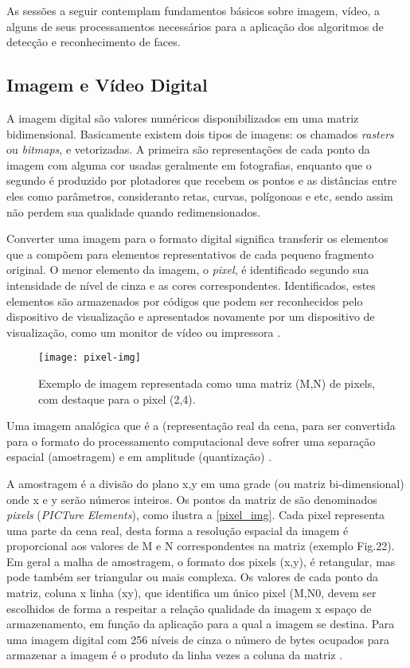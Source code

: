 As sessões a seguir contemplam fundamentos básicos sobre imagem, vídeo, a alguns de seus processamentos necessários para a aplicação dos algoritmos de detecção e reconhecimento de faces.


\subsection{Imagem e Vídeo Digital}\label{subsec:imagem}

A imagem digital são valores numéricos disponibilizados em uma matriz bidimensional. Basicamente existem dois tipos de imagens: os chamados \textit{rasters} ou \textit{bitmaps}, e vetorizadas. A primeira são representações de cada ponto da imagem com alguma cor usadas geralmente em fotografias, enquanto que o segundo é produzido por plotadores que recebem os pontos e as distâncias entre eles como parâmetros, consideranto retas, curvas, polígonoas e etc, sendo assim não perdem sua qualidade quando redimensionados.

Converter uma imagem para o formato digital significa transferir os elementos que a compõem para elementos representativos de cada pequeno fragmento original. O menor elemento da imagem, o \textit{pixel}, é identificado segundo sua intensidade de nível de cinza e as cores correspondentes. Identificados, estes elementos são armazenados por códigos que podem ser reconhecidos pelo dispositivo de visualização e apresentados novamente por um dispositivo de visualização, como um monitor de vídeo ou impressora \cite{img-digital-willians}. 

\begin{figure}[h]
	\centering
	\texttt{[image: pixel-img]}
	\caption{Exemplo de imagem representada como uma matriz (M,N) de pixels, com destaque para o pixel (2,4).}
	\label{pixel_img}
\end{figure}


Uma imagem analógica que é a (representação real da cena, para ser convertida para o formato do
processamento computacional deve sofrer uma separação espacial (amostragem) e em amplitude
(quantização) \cite{img-digital-willians}. 

A amostragem é a divisão do plano x,y em uma grade (ou matriz bi-dimensional) onde x e y serão números inteiros. Os pontos da matriz de são denominados \textit{pixels} (\textit{PICTure Elements}), como ilustra a \autoref{pixel_img}. Cada pixel representa uma parte da cena real, desta forma a resolução espacial da imagem é proporcional aos valores de M e N correspondentes na matriz (exemplo Fig.22). Em geral a malha de amostragem, o formato dos pixels (x,y), é retangular, mas pode também ser triangular ou mais complexa. Os valores de cada ponto da matriz, coluna x linha (xy), que identifica um único pixel (M,N0, devem ser escolhidos de forma a respeitar a relação qualidade da imagem x espaço de armazenamento, em função da aplicação para a qual a imagem se destina. Para uma imagem digital com 256 níveis de cinza o número de bytes ocupados para armazenar a imagem é o produto da linha vezes a coluna da matriz \cite{img-digital-willians}. 

